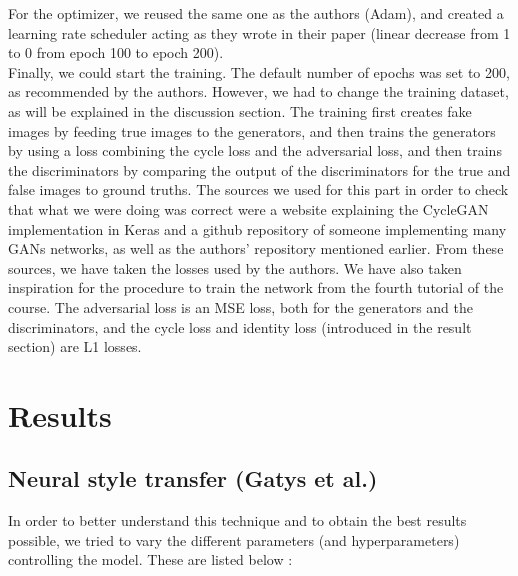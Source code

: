 \documentclass[twocolumn,superscriptaddress,aps,floatfix, nofootinbib]{revtex4-1}
\begin{document}
    For the optimizer, we reused the same one as the authors (Adam), and created a learning rate scheduler acting as they wrote in their paper (linear decrease from 1 to 0 from epoch 100 to epoch 200).\\
    
    Finally, we could start the training. The default number of epochs was set to 200, as recommended by the authors. However, we had to change the training dataset, as will be explained in the discussion section. The training first creates fake images by feeding true images to the generators, and then trains the generators by using a loss combining the cycle loss and the adversarial loss, and then trains the discriminators by comparing the output of the discriminators for the true and false images to ground truths. The sources we used for this part in order to check that what we were doing was correct were a website explaining the CycleGAN implementation in Keras\cite{keras} and a github repository of someone implementing many GANs networks\cite{erik}, as well as the authors' repository mentioned earlier. From these sources, we have taken the losses used by the authors. We have also taken inspiration for the procedure to train the network from the fourth tutorial of the course. The adversarial loss is an MSE loss, both for the generators and the discriminators, and the cycle loss and identity loss (introduced in the result section) are L1 losses.
    
    
    
    
    \section{Results}
    
    \subsection{Neural style transfer (Gatys et al.)}\label{sec:results.gatys}
    
    In order to better understand this technique and to obtain the best results possible, we tried to vary the different parameters (and hyperparameters) controlling the model. These are listed below :
    
\end{document}
